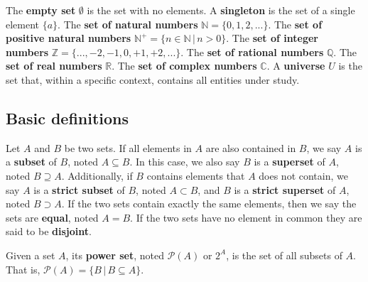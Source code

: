 \documentclass{bareminimum}
\begin{document}
\begin{defn}
	 The \textbf{empty set}
	  $\emptyset$ is the set with no elements. A \textbf{singleton} is the set of a single element $\{a\}$.
	 The \textbf{set of natural numbers} $\mathbb{N} = \{ 0, 1, 2, ... \}$. The \textbf{set of positive natural numbers} $\mathbb{N}^+ = \{n \in \mathbb{N} \, | \, n > 0\}$. The \textbf{set of integer numbers} $\mathbb{Z} = \{ ... , -2, -1, 0, +1, +2, ...\}$. The \textbf{set of rational numbers} $\mathbb{Q}$. The \textbf{set of real numbers} $\mathbb{R}$. The \textbf{set of complex numbers} $\mathbb{C}$. A \textbf{universe} $U$ is the set that, within a specific context, contains all entities under study.
\end{defn}

\subsection{Basic definitions}


\begin{defn}
	Let $A$ and $B$ be two sets.  If all elements in $A$ are also contained in $B$, we say $A$ is a \textbf{subset} of $B$, noted $A \subseteq B$. In this case, we also say $B$ is a \textbf{superset} of $A$, noted $B \supseteq A$. Additionally, if $B$ contains elements that $A$ does not contain, we say $A$ is a \textbf{strict subset} of $B$, noted $A \subset B$, and $B$ is a \textbf{strict superset} of $A$, noted $B \supset A$. If the two sets contain exactly the same elements, then we say the sets are \textbf{equal}, noted $A = B$. If the two sets have no element in common they are said to be \textbf{disjoint}.
\end{defn}

\begin{defn}
	Given a set $A$, its \textbf{power set},  noted $\mathcal{P}(A)$ or $2^{A}$, is the set of all subsets of $A$. That is, $\mathcal{P}(A) = \{B \, | \, B \subseteq A \}$.
\end{defn}
\end{document}
